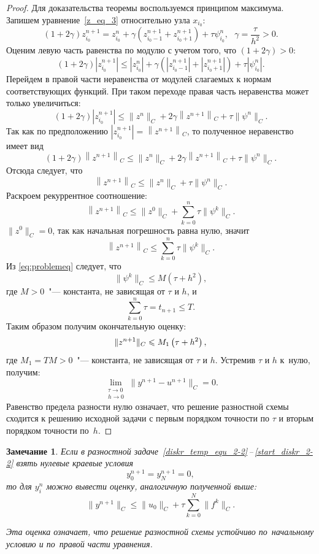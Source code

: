 \documentclass[11pt,a4paper,twoside]{report}
\numberwithin{equation}{section}
\theoremstyle{definition}
\theoremstyle{plain}
\newtheorem*{note*}{Замечание}
\DeclarePairedDelimiter\norm{\lVert}{\rVert}
\begin{document}
\begin{proof}
Для доказательства теоремы воспользуемся принципом максимума.
Запишем уравнение~\eqref{z_eq_3} относительно
узла $x_{i_0}$:
%
$$
    \left(1 + 2\gamma\right)z_{i_0}^{n+1} = z_{i_0}^n + \gamma\left(z_{i_0-1}^{n+1} +
    z_{i_0+1}^{n+1}\right) + \tau \psi_{i_0}^n, ~~~\gamma = \frac{\tau}{h^2}>0.
$$
%
Оценим левую часть равенства по модулю с учетом того, что $\left(1+2\gamma\right)>0$:
%
$$
    \left(1 + 2\gamma\right)\left|z_{i_0}^{n+1}\right| \leqslant \left|z_{i_0}^n\right| +
    \gamma\left(\left|z_{i_0 - 1}^{n+1}\right| +
    \left|z_{i_0 + 1}^{n+1}\right|\right) + \tau\left|\psi_{i_0}^n\right|.
$$
%
Перейдем в правой части неравенства от модулей слагаемых к нормам соответствующих
функций. При таком переходе правая часть неравенства может только увеличиться:
%
$$
    \left(1 + 2\gamma\right)\left|z_{i_0}^{n+1}\right| \leqslant
    \big\|z^{n}\big\|_C + 2\gamma\left\|z^{n+1}\right\|_C +
    \tau \big\|\psi^n\big\|_C.
$$
%
Так как по предположению $\left|z_{i_0}^{n+1}\right| = \left\|z^{n+1}\right\|_C$,
то полученное неравенство имеет вид
%
$$
    \left(1 + 2\gamma\right)\left\|z^{n+1}\right\|_C \leqslant
    \big\|z^{n}\big\|_C + 2\gamma\left\|z^{n+1}\right\|_C +
    \tau \big\|\psi^n\big\|_C.
$$
%
Отсюда следует, что
%
$$
    \left\|z^{n+1}\right\|_C \leqslant \big\|z^n\big\|_C + \tau \big\|\psi^n\big\|_C.
$$
%
Раскроем рекуррентное соотношение:
%
$$
    \left\|z^{n+1}\right\|_C \leqslant \big\|z^0\big\|_C +
    \sum_{k=0}^{n} \tau\big\|\psi^k\big\|_C.
$$
%
$\big\|z^0\big\|_C = 0$, так как начальная погрешность равна нулю, значит
%
$$
    \left\|z^{n+1}\right\|_C \leqslant \sum_{k=0}^n \tau \big\|\psi^k\big\|_C.
$$
%
Из \eqref{eq:problemeq} следует, что
%
$$
    \big\|\psi^k\big\|_C \leqslant M\left(\tau + h^2\right),
$$
%
где $M>0$~"--- константа, не зависящая от $\tau$ и $h$, и
%
$$
    \sum_{k = 0}^n\tau = t_{n+1} \leqslant T.
$$
%
Таким образом получим окончательную оценку:
%
$$
    \norm{z^{n+1}}_C \leqslant M_1\left(\tau + h^2\right),
$$
%
где $M_1=TM>0$~"--- константа, не зависящая от $\tau$ и $h$.
Устремив $\tau$ и $h$ к~нулю, получим:
%
$$
    \lim_{\substack{\tau \rightarrow 0\\h \rightarrow 0}}\big\|y^{n+1}-u^{n+1}\big\|_C = 0.
$$
%
Равенство предела разности нулю означает, что решение разностной схемы
сходится к решению исходной задачи с первым
порядком точности по $\tau$ и вторым порядком точности по~$h$.
%
\end{proof}
%
%
\begin{note*}
%
Если в разностной задаче~\eqref{diskr_temp_equ_2-2}\,--\,\eqref{start_diskr_2-2}
взять нулевые краевые условия
%
$$
    y_0^{n+1} = y_N^{n+1} = 0,
$$
%
то для $y_i^n$ можно вывести оценку, аналогичную полученной выше:
%
$$
    \big\|y^{n+1}\big\|_C \leqslant \big\|u_0\big\|_C +
    \tau \sum_{k=0}^N \big\|f^k\big\|_C.
$$
%

Эта оценка означает, что решение разностной схемы устойчиво по~начальному
условию и по~правой части уравнения.
%
\end{note*}
%
\end{document}

